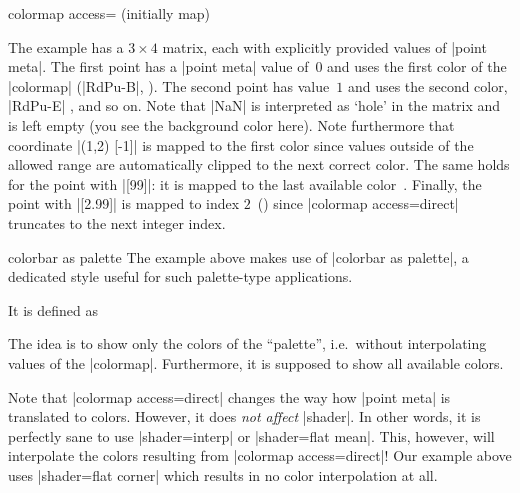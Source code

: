 \begin{pgfplotskey}{colormap access= (initially map)}
\begin{codeexample}[]
\end{codeexample}
	The example has a $3\times 4$ matrix, each with explicitly provided values of |point meta|. The first point has a |point meta| value of~$0$ and uses the first color of the |colormap| (|RdPu-B|, ). The second point has value~$1$ and uses the second color, |RdPu-E| , and so on. Note that |NaN| is interpreted as `hole' in the matrix and is left empty (you see the background color here). Note furthermore that coordinate |(1,2) [-1]| is mapped to the first color since values outside of the allowed range are automatically clipped to the next correct color. The same holds for the point with |[99]|: it is mapped to the last available color~. Finally, the point with |[2.99]| is mapped to index $2$~() since |colormap access=direct| truncates to the next integer index.

\begin{pgfplotskey}{colorbar as palette}
	The example above makes use of |colorbar as palette|, a dedicated style useful for such palette-type applications.

	It is defined as
\begin{codeexample}
\end{codeexample}
	The idea is to show only the colors of the ``palette'', i.e.\ without interpolating values of the |colormap|. Furthermore, it is supposed to show all available colors.
\end{pgfplotskey}

	Note that |colormap access=direct| changes the way how |point meta| is translated to colors. However, it does \emph{not affect} |shader|. In other words, it is perfectly sane to use |shader=interp| or |shader=flat mean|. This, however, will interpolate the colors resulting from |colormap access=direct|! Our example above uses |shader=flat corner| which results in no color interpolation at all.


\end{pgfplotskey}
